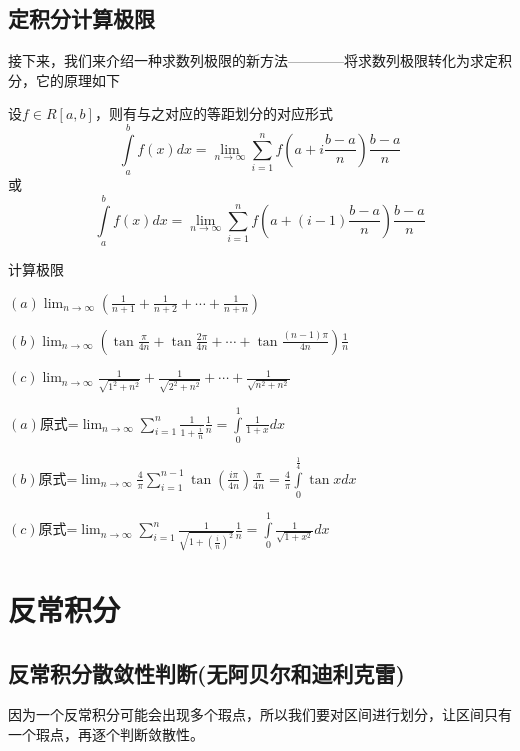 \documentclass[lang=cn,10pt]{elegantbook}
\begin{document}
\subsection{定积分计算极限}
接下来，我们来介绍一种求数列极限的新方法————将求数列极限转化为求定积分，它的原理如下
\begin{proposition}
	设$f \in R[a,b]$，则有与之对应的等距划分的对应形式
	\begin{equation*}
		\int\limits_a^b{f\left( x \right) dx}=\lim_{n\rightarrow \infty} \sum_{i=1}^n{f\left( a+i\frac{b-a}{n} \right) \frac{b-a}{n}}
	\end{equation*}
	或
	\begin{equation*}
		\int\limits_a^b{f\left( x \right) dx}=\lim_{n\rightarrow \infty} \sum_{i=1}^n{f\left( a+(i-1)\frac{b-a}{n} \right) \frac{b-a}{n}}
	\end{equation*}
\end{proposition}
\begin{example}
	计算极限
	
	$(a)\lim_{n\rightarrow \infty} \left( \frac{1}{n+1}+\frac{1}{n+2}+\cdots +\frac{1}{n+n} \right) $
	
	$(b)\lim_{n\rightarrow \infty} \left( \tan \frac{\pi}{4n}+\tan \frac{2\pi}{4n}+\cdots +\tan \frac{\left( n-1 \right) \pi}{4n} \right) \frac{1}{n}
	$
	
	$(c)\lim_{n\rightarrow \infty} \frac{1}{\sqrt{1^2+n^2}}+\frac{1}{\sqrt{2^2+n^2}}+\cdots +\frac{1}{\sqrt{n^2+n^2}}
	$
\end{example}
\begin{solution}
	
	$(a)$原式=$\lim_{n\rightarrow \infty} \sum_{i=1}^n{\frac{1}{1+\frac{i}{n}}\frac{1}{n}=\int\limits_0^1{\frac{1}{1+x}dx}}
	$
	
	$(b)$原式=$\lim_{n\rightarrow \infty} \frac{4}{\pi}\sum_{i=1}^{n-1}{\tan \left( \frac{i\pi}{4n} \right) \frac{\pi}{4n}=\frac{4}{\pi}\int\limits_0^{\frac{1}{4}}{\tan xdx}}$
	
	
	$(c)$原式=$\lim_{n\rightarrow \infty} \sum_{i=1}^n{\frac{1}{\sqrt{1+\left( \frac{i}{n} \right) ^2}}\frac{1}{n}=\int\limits_0^1{\frac{1}{\sqrt{1+x^2}}dx}}$
	
	
\end{solution}
\section{反常积分}
\subsection{反常积分散敛性判断(无阿贝尔和迪利克雷)}
因为一个反常积分可能会出现多个瑕点，所以我们要对区间进行划分，让区间只有一个瑕点，再逐个判断敛散性。
\end{document}
